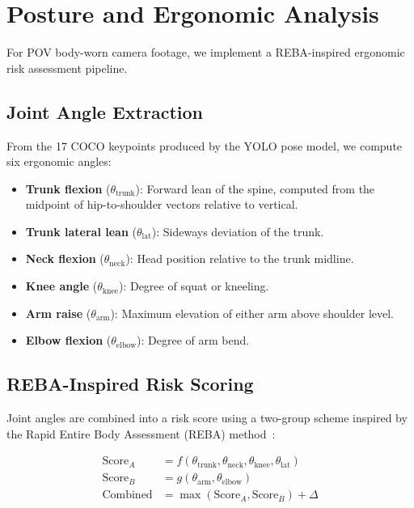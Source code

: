 \documentclass[11pt, twocolumn]{article}
\begin{document}
\section{Posture and Ergonomic Analysis}

For POV body-worn camera footage, we implement a REBA-inspired ergonomic risk assessment pipeline.

\subsection{Joint Angle Extraction}

From the 17 COCO keypoints produced by the YOLO pose model, we compute six ergonomic angles:

\begin{itemize}[nosep, leftmargin=*]
    \item \textbf{Trunk flexion} ($\theta_{\text{trunk}}$): Forward lean of the spine, computed from the midpoint of hip-to-shoulder vectors relative to vertical.
    \item \textbf{Trunk lateral lean} ($\theta_{\text{lat}}$): Sideways deviation of the trunk.
    \item \textbf{Neck flexion} ($\theta_{\text{neck}}$): Head position relative to the trunk midline.
    \item \textbf{Knee angle} ($\theta_{\text{knee}}$): Degree of squat or kneeling.
    \item \textbf{Arm raise} ($\theta_{\text{arm}}$): Maximum elevation of either arm above shoulder level.
    \item \textbf{Elbow flexion} ($\theta_{\text{elbow}}$): Degree of arm bend.
\end{itemize}

\subsection{REBA-Inspired Risk Scoring}

Joint angles are combined into a risk score using a two-group scheme inspired by the Rapid Entire Body Assessment (REBA) method~\cite{hignett2000}:

\begin{align}
\text{Score}_A &= f(\theta_{\text{trunk}}, \theta_{\text{neck}}, \theta_{\text{knee}}, \theta_{\text{lat}}) \\
\text{Score}_B &= g(\theta_{\text{arm}}, \theta_{\text{elbow}}) \\
\text{Combined} &= \max(\text{Score}_A, \text{Score}_B) + \Delta
\end{align}
\end{document}
